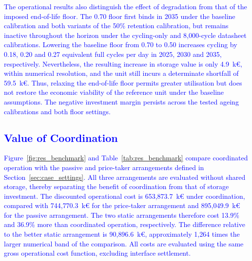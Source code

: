 \documentclass[preprint,12pt]{elsarticle}
\begin{document}
\textcolor{blue}{
    The operational results also distinguish the effect of degradation from that of the imposed end-of-life floor. The 0.70 floor first binds in 2035 under the baseline calibration and both variants of the 50\% retention calibration, but remains inactive throughout the horizon under the cycling-only and 8{,}000-cycle datasheet calibrations. Lowering the baseline floor from 0.70 to 0.50 increases cycling by 0.18, 0.20 and 0.27 equivalent full cycles per day in 2025, 2030 and 2035, respectively. Nevertheless, the resulting increase in storage value is only 4.9~k\euro{}, within numerical resolution, and the unit still incurs a determinate shortfall of 59.5~k\euro{}. Thus, relaxing the end-of-life floor permits greater utilisation but does not restore the economic viability of the reference unit under the baseline assumptions. The negative investment margin persists across the tested ageing calibrations and both floor settings.
}

\subsection{\textcolor{blue}{Value of Coordination}}
\label{subsec:res_coordination}

\textcolor{blue}{
    Figure~\ref{fig:res_benchmark} and Table~\ref{tab:res_benchmark} compare coordinated operation with the passive and price-taker arrangements defined in Section~\ref{sec:case_settings}. All three arrangements are evaluated without shared storage, thereby separating the benefit of coordination from that of storage investment. The discounted operational cost is 653{,}873.7~k\euro{} under coordination, compared with 744{,}770.3~k\euro{} for the price-taker arrangement and 895{,}049.9~k\euro{} for the passive arrangement. The two static arrangements therefore cost 13.9\% and 36.9\% more than coordinated operation, respectively. The difference relative to the better static arrangement is 90{,}896.6~k\euro{}, approximately 1{,}264 times the larger numerical band of the comparison. All costs are evaluated using the same gross operational cost function, excluding interface settlement.
}
\end{document}
